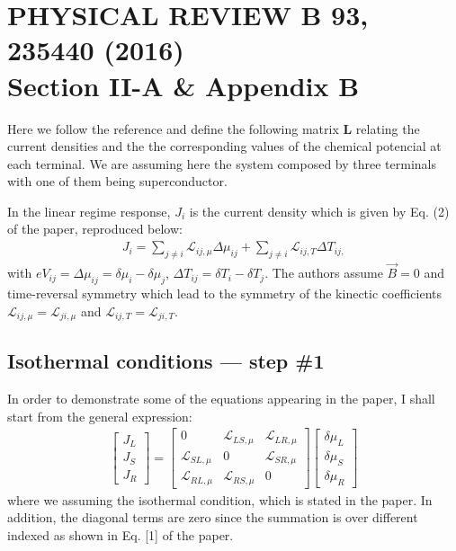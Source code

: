 \section{PHYSICAL REVIEW B 93, 235440 (2016)\\Section II-A \& Appendix B}

Here we follow the reference and define the following matrix $\mathbf{L}$ relating the current densities and the the corresponding values of the chemical potencial at each terminal. We are assuming here the system composed by three terminals with one of them being superconductor. 


In the linear regime response, $J_{i}$ is the current density which is given by Eq. (2) of the paper, reproduced below:
\begin{align}\label{Ji}
J_{i}=\sum_{j\neq i}\mathcal{L}_{ij,\mu}\Delta\mu_{ij}+\sum_{j\neq i}\mathcal{L}_{ij,T}\Delta T_{ij,}
\end{align}
with
$eV_{ij}=\Delta\mu_{ij}=\delta\mu_{i}-\delta\mu_{j}$, $\Delta T_{ij}=\delta T_{i}-\delta T_{j}$. The authors assume $\vec{B}=0$ and time-reversal symmetry which lead to the symmetry of the kinectic coefficients $\mathcal{L}_{ij,\mu}=\mathcal{L}_{ji,\mu}$ and $\mathcal{L}_{ij, T}=\mathcal{L}_{ji,T}$.


\subsection{Isothermal conditions --- step \#1}

In order to demonstrate some of the equations appearing in the paper, I shall start from the general expression:
\begin{align*}
\begin{bmatrix}
J_{L}
\\
J_{S}
\\
J_{R}
\end{bmatrix}
=
\begin{bmatrix}
0 & \mathcal{L}_{LS,\mu} & \mathcal{L}_{LR,\mu}
\\
\mathcal{L}_{SL,\mu} & 0 & \mathcal{L}_{SR,\mu}
\\
\mathcal{L}_{RL,\mu} & \mathcal{L}_{RS,\mu} & 0
\end{bmatrix}
\begin{bmatrix}
\delta\mu_{L}
\\
\delta\mu_{S}
\\
\delta\mu_{R}
\end{bmatrix}
\end{align*}
where we assuming the isothermal condition, which is stated in the paper. In addition, the diagonal terms are zero since the summation is over different indexed as shown in Eq. [1] of the paper.

